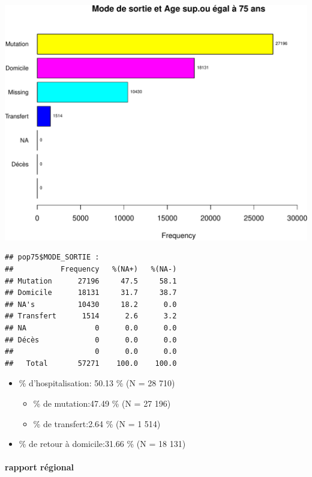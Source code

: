 \documentclass[]{article}
\begin{document}
\includegraphics{rapport2014_V4_files/figure-latex/sortie75-1.pdf}

\begin{verbatim}
## pop75$MODE_SORTIE : 
##           Frequency   %(NA+)   %(NA-)
## Mutation      27196     47.5     58.1
## Domicile      18131     31.7     38.7
## NA's          10430     18.2      0.0
## Transfert      1514      2.6      3.2
## NA                0      0.0      0.0
## Décès             0      0.0      0.0
##                   0      0.0      0.0
##   Total       57271    100.0    100.0
\end{verbatim}

\begin{itemize}
\itemsep1pt\parskip0pt
\item
  \% d'hospitalisation: 50.13 \% (N = 28 710)

  \begin{itemize}
  \itemsep1pt\parskip0pt
  \item
    \% de mutation:47.49 \% (N = 27 196)
  \item
    \% de transfert:2.64 \% (N = 1 514)
  \end{itemize}
\item
  \% de retour à domicile:31.66 \% (N = 18 131)
\end{itemize}

\paragraph{rapport régional}\label{rapport-regional}
\end{document}
